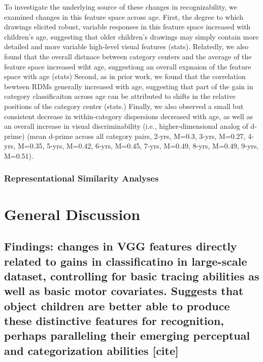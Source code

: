 \documentclass[10pt, letterpaper]{article}
\begin{document}
To investigate the underlying source of these changes in
recognizability, we examined changes in this feature space across age.
First, the degree to which drawings elicited robust, variable responses
in this feature space increased with children's age, suggesting that
older children's drawings may simply contain more detailed and more
variable high-level visual features (stats). Relatedly, we also found
that the overall distnace between category centers and the average of
the feature space increased wiht age, suggestiong an overall expnaion of
the feature space with age (stats) Second, as in prior work, we found
that the correlation bewteen RDMs generally increased with age,
suggesting that part of the gain in category classificaiton across age
can be attributed to shifts in the relative positions of the category
center (stats.) Finally, we also observed a small but consistent
decrease in within-category dispersions decreased with age, as well as
an overall increase in visual discriminability (i.e., higher-dimensional
analog of d-prime) (mean d-prime across all category pairs, 2-yrs,
M=0.3, 3-yrs, M=0.27, 4-yrs, M=0.35, 5-yrs, M=0.42, 6-yrs, M=0.45,
7-yrs, M=0.49, 8-yrs, M=0.49, 9-yrs, M=0.51).

\subsubsection{Representational Similarity
Analyses}\label{representational-similarity-analyses}

\section{General Discussion}\label{general-discussion}

\subsection{Findings: changes in VGG features directly related to gains
in classificatino in large-scale dataset, controlling for basic tracing
abilities as well as basic motor covariates. Suggests that object
children are better able to produce these distinctive features for
recognition, perhaps paralleling their emerging perceptual and
categorization abilities
{[}cite{]}}\label{findings-changes-in-vgg-features-directly-related-to-gains-in-classificatino-in-large-scale-dataset-controlling-for-basic-tracing-abilities-as-well-as-basic-motor-covariates.-suggests-that-object-children-are-better-able-to-produce-these-distinctive-features-for-recognition-perhaps-paralleling-their-emerging-perceptual-and-categorization-abilities-cite}
\end{document}
